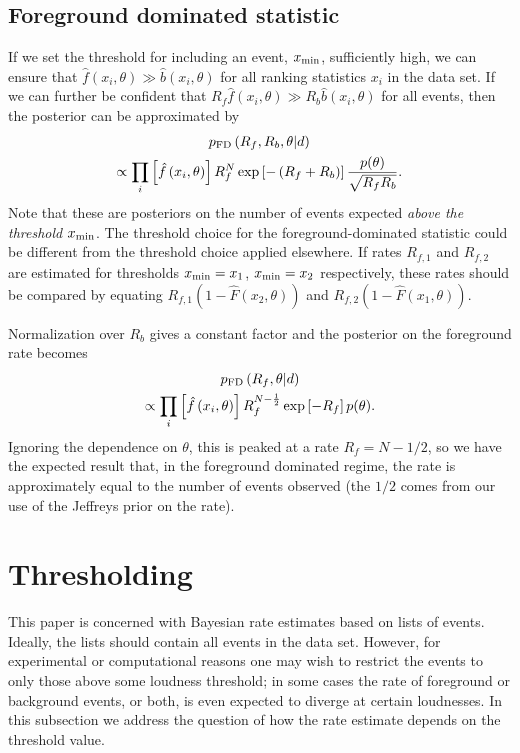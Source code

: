 \documentclass[aps,prd,reprint,nofootinbib]{revtex4-1}
\begin{document}
\subsection{Foreground dominated statistic}
If we set the threshold for including an event, $x_{\rm min}$,
sufficiently high, we can ensure that $\hat{f}(x_i,\theta) \gg
\hat{b}(x_i,\theta)$ for all ranking statistics $x_i$ in the data
set.  If we can further be confident that $R_f \hat{f}(x_i,\theta) \gg R_b \hat{b}(x_i,\theta)$ for all events, then the posterior can be approximated by
\begin{multline}
p_{\rm FD}\left( R_f, R_b, \theta | d \right) \\ \propto \prod_{i} \left[
  \hat{f}\left(x_i, \theta\right)\right] R_f^N \exp\left[-\left( R_f +
  R_b \right) \right] \frac{p(\theta)}{\sqrt{R_f R_b}}.
\end{multline}
Note that these are posteriors on the number of events expected \emph{above the
threshold $x_{\rm min}$}.  The threshold choice for the foreground-dominated statistic could be different from the threshold choice applied elsewhere.  If rates $R_{f,1}$ and $R_{f,2}$ are estimated for thresholds $x_{\rm min}=x_1$, $x_{\rm min}=x_2$ respectively, these rates should be compared by equating $R_{f,1} (1-\hat{F}(x_2,\theta))$ and $R_{f,2} (1-\hat{F}(x_1,\theta))$.

Normalization over $R_b$ gives a constant factor and the posterior on
the foreground rate becomes
\begin{multline}
p_{\rm FD}\left( R_f, \theta | d \right) \\ \propto \prod_{i} \left[
  \hat{f}\left(x_i, \theta\right)\right] R_f^{N-\frac{1}{2}}
\exp\left[-R_f \right] p(\theta).
\end{multline}
Ignoring the dependence on $\theta$, this is peaked at a rate $R_f =
N-1/2$, so we have the expected result that, in the foreground
dominated regime, the rate is approximately equal to the number of
events observed (the $1/2$ comes from our use of the Jeffreys prior on
the rate).  

\section{Thresholding}
This paper is concerned with Bayesian rate estimates based on lists of
events.  Ideally, the lists should contain all events in the data set.
However, for experimental or computational reasons one may wish to
restrict the events to only those above some loudness threshold; in
some cases the rate of foreground or background events, or both, is
even expected to diverge at certain loudnesses.  In this subsection we
address the question of how the rate estimate depends on the threshold
value.
\end{document}
